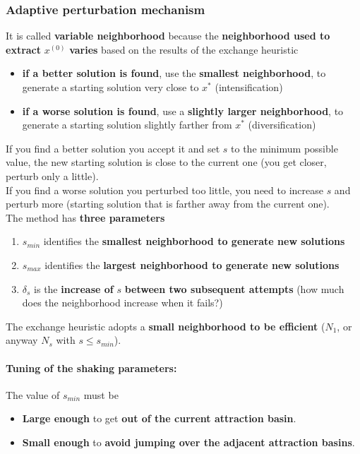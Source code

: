 \newpage

\subsubsection{Adaptive perturbation mechanism}
It is called \textbf{variable neighborhood} because the \textbf{neighborhood used to extract} $x^{(0)}$ \textbf{varies} based on the results of the exchange heuristic
\begin{itemize}
	\item \textbf{if a better solution is found}, use the \textbf{smallest neighborhood}, to generate a starting solution very close to $x^\ast$ (intensification)
	
	\item \textbf{if a worse solution is found}, use a \textbf{slightly larger neighborhood}, to generate a starting solution slightly farther from $x^\ast$ (diversification)
\end{itemize}

If you find a better solution you accept it and set $s$ to the minimum possible value, the new starting solution is close to the current one (you get closer, perturb only a little).\\
If you find a worse solution you perturbed too little, you need to increase $s$ and perturb more (starting solution that is farther away from the current one).\\


The method has \textbf{three parameters}
\begin{enumerate}
	\item $s_{min}$ identifies the \textbf{smallest neighborhood to generate new solutions}
	
	\item $s_{max}$ identifies the \textbf{largest neighborhood to generate new solutions}
	
	\item $\delta_s$ is the \textbf{increase of} $s$ \textbf{between two subsequent attempts} (how much does the neighborhood increase when it fails?)
\end{enumerate}

The exchange heuristic adopts a \textbf{small neighborhood to be efficient} ($N_1$, or anyway $N_s$ with $s \leq s_{min}$).\\

\newpage

\paragraph{Tuning of the shaking parameters:} The value of $s_{min}$ must be
\begin{itemize}
	\item \textbf{Large enough} to get \textbf{out of the current attraction basin}.\\
	
	\item \textbf{Small enough} to \textbf{avoid jumping over the adjacent attraction basins}.\\
\end{itemize}

